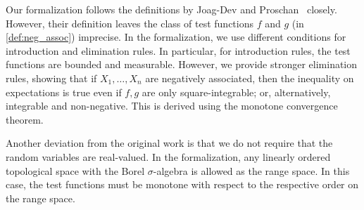 \documentclass[a4paper,UKenglish,cleveref, autoref, thm-restate]{lipics-v2021}
\begin{document}
Our formalization follows the definitions by Joag-Dev and Proschan~\cite{joagdev1983} closely.
However, their definition leaves the class of test functions $f$ and $g$ (in \cref{def:neg_assoc}) imprecise.
In the formalization, we use different conditions for introduction and elimination rules.
In particular, for introduction rules, the test functions are bounded and measurable.
However, we provide stronger elimination rules, showing that if $X_1,\dots,X_n$ are negatively associated, then the inequality on expectations is true even if $f, g$ are only square-integrable; or, alternatively, integrable and non-negative. This is derived using the monotone convergence theorem.

Another deviation from the original work is that we do not require that the random variables are real-valued.
In the formalization, any linearly ordered topological space with the Borel $\sigma$-algebra is allowed as the range space.
In this case, the test functions must be monotone with respect to the respective order on the range space.
\end{document}
